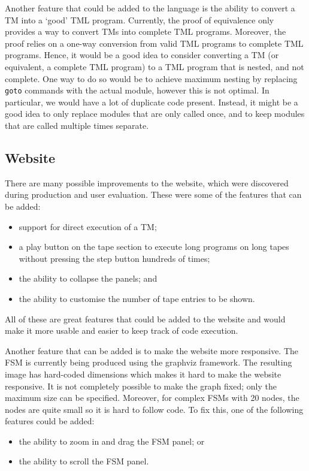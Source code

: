 Another feature that could be added to the language is the ability to convert a TM into a `good' TML program. Currently, the proof of equivalence only provides a way to convert TMs into complete TML programs. Moreover, the proof relies on a one-way conversion from valid TML programs to complete TML programs. Hence, it would be a good idea to consider converting a TM (or equivalent, a complete TML program) to a TML program that is nested, and not complete. One way to do so would be to achieve maximum nesting by replacing \texttt{goto} commands with the actual module, however this is not optimal. In particular, we would have a lot of duplicate code present. Instead, it might be a good idea to only replace modules that are only called once, and to keep modules that are called multiple times separate. 

 \subsection{Website}
There are many possible improvements to the website, which were discovered during production and user evaluation. These were some of the features that can be added:
\begin{itemize}
    \item support for direct execution of a TM;
    \item a play button on the tape section to execute long programs on long tapes without pressing the step button hundreds of times;
    \item the ability to collapse the panels; and
    \item the ability to customise the number of tape entries to be shown.
\end{itemize}
All of these are great features that could be added to the website and would make it more usable and easier to keep track of code execution. 

Another feature that can be added is to make the website more responsive. The FSM is currently being produced using the graphviz framework. The resulting image has hard-coded dimensions which makes it hard to make the website responsive. It is not completely possible to make the graph fixed; only the maximum size can be specified. Moreover, for complex FSMs with 20 nodes, the nodes are quite small so it is hard to follow code. To fix this, one of the following features could be added:
\begin{itemize}
    \item the ability to zoom in and drag the FSM panel; or
    \item the ability to scroll the FSM panel.
\end{itemize}

